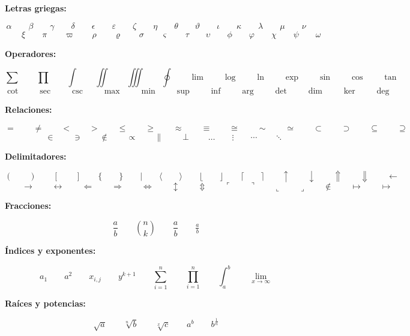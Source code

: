 \documentclass[landscape,15pt]{article}
\begin{document}
\textbf{Letras griegas:}

$$\displaystyle \alpha \qquad \beta \qquad \gamma \qquad \delta \qquad \epsilon \qquad \varepsilon \qquad \zeta \qquad \eta \qquad \theta \qquad \vartheta \qquad \iota \qquad \kappa \qquad \lambda \qquad \mu \qquad \nu$$
$$ \qquad \xi \qquad \pi \qquad \varpi \qquad \rho \qquad \varrho \qquad \sigma \qquad \varsigma \qquad \tau \qquad \upsilon \qquad \phi \qquad \varphi \qquad \chi \qquad \psi \qquad \omega$$

\textbf{Operadores:}

$$\displaystyle \sum \qquad \prod \qquad \int \qquad \iint \qquad \iiint \qquad \oint \qquad \lim \qquad \log \qquad \ln \qquad \exp \qquad \sin \qquad \cos \qquad \tan \qquad$$
$$ \cot \qquad \sec \qquad \csc \qquad \max \qquad \min \qquad \sup \qquad \inf \qquad \arg \qquad \det \qquad \dim \qquad \ker \qquad \deg$$

\textbf{Relaciones:}

$$\displaystyle = \qquad \neq \qquad < \qquad > \qquad \leq \qquad \geq \qquad \approx \qquad \equiv \qquad \cong \qquad \sim \qquad \simeq \qquad \subset \qquad \supset \qquad \subseteq \qquad \supseteq $$
$$\qquad \in \qquad \ni \qquad \notin \qquad \propto \qquad \parallel \qquad \perp \qquad \dots \qquad \vdots \qquad \cdots \qquad \ddots$$

\textbf{Delimitadores:}

$$\displaystyle ( \qquad ) \qquad [ \qquad ] \qquad \{ \qquad \} \qquad | \qquad \langle \qquad \rangle \qquad \lfloor \qquad \rfloor \qquad \lceil \qquad \rceil \qquad \uparrow \qquad \downarrow \qquad \Uparrow \qquad \Downarrow \qquad \leftarrow$$
$$ \qquad \rightarrow \qquad \leftrightarrow \qquad \Leftarrow \qquad \Rightarrow \qquad \Leftrightarrow \qquad \updownarrow \qquad \Updownarrow \qquad \ulcorner \qquad \urcorner \qquad \llcorner \qquad \lrcorner \qquad \not\in \qquad \mapsto \qquad \longmapsto$$

\textbf{Fracciones:}

$$\displaystyle \frac{a}{b} \qquad \binom{n}{k} \qquad \dfrac{a}{b} \qquad \tfrac{a}{b}$$

\textbf{Índices y exponentes:}

$$\displaystyle a_1 \qquad a^2 \qquad x_{i,j} \qquad y^{k+1} \qquad \sum_{i=1}^{n} \qquad \prod_{i=1}^{n} \qquad \int_{a}^{b} \qquad \lim_{x \to \infty}$$

\textbf{Raíces y potencias:}

$$\displaystyle \sqrt{a} \qquad \sqrt[n]{b} \qquad \sqrt[x]{c} \qquad a^b \qquad b^{\frac{1}{n}}$$
\end{document}
